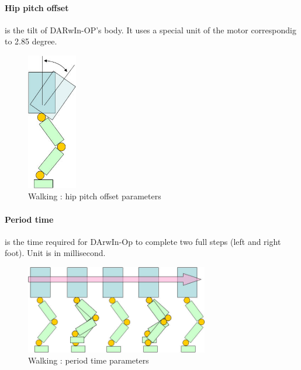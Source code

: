 \documentclass[a4paper, 12pt]{article}  		%
\begin{document}
\paragraph*{Hip pitch offset}
is the tilt of DARwIn-OP's body. It uses a special unit of the motor correspondig to 2.85 degree.
\begin{figure}[H]
\begin{center}
\includegraphics[height=6cm]{hip_pitch_offset.jpg}
\caption{Walking : hip pitch offset parameters}
\label{hip_pitch_offset}
\end{center}
\end{figure}

\newpage
\paragraph*{Period time}
is the time required for DArwIn-Op to complete two full steps (left and right foot). Unit is in millisecond.
\begin{figure}[H]
\begin{center}
\includegraphics[width=8cm]{period_time.jpg}
\caption{Walking : period time parameters}
\label{period_time}
\end{center}
\end{figure}
\end{document}
